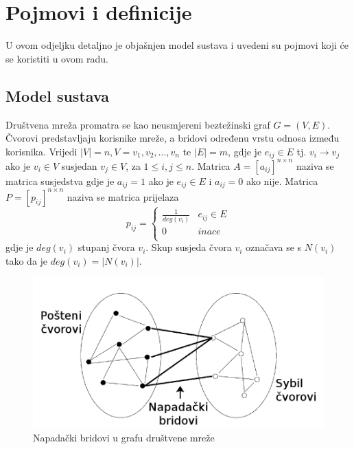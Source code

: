 \documentclass[times, utf8, seminar, numeric]{fer}
\begin{document}
\section{Pojmovi i definicije} \label{sec:terminology}
U ovom odjeljku detaljno je objašnjen model sustava i uvedeni su pojmovi koji će se koristiti u ovom radu.

\subsection{Model sustava}
Društvena mreža promatra se kao neusmjereni beztežinski graf $G = (V, E)$. Čvorovi predstavljaju korisnike mreže, a bridovi određenu vrstu odnosa između korisnika. Vrijedi $|V| = n, V = {v_1, v_2, ..., v_n}$ te $|E| = m$, gdje je $e_{ij} \in E$ tj. $v_i \to v_j$ ako je $v_i \in V$ susjedan $v_j \in V$, za $1 \leq i, j \leq n$. Matrica $A = [a_{ij}]^{n \times n}$ naziva se matrica susjedstva gdje je $a_{ij} = 1$ ako je $e_{ij} \in E$ i $a_{ij} = 0$ ako nije. Matrica $P = [p_{ij}]^{n \times n}$ naziva se matrica prijelaza 
\begin{equation} \label{eq:transition}
  p_{ij} = 
  \begin{cases}
    \frac{1}{deg(v_i)} & e_{ij} \in E \\
    0 & inace \\
  \end{cases}
\end{equation}
gdje je $deg(v_i)$ stupanj čvora $v_i$. Skup susjeda čvora $v_i$ označava se s $N(v_i)$ tako da je $deg(v_i) = |N(v_i)|$.

\begin{figure}[h]
	\centering
	\includegraphics[scale=0.3]{attack.png}
	\caption{Napadački bridovi u grafu društvene mreže}
	\label{fig:attack}
\end{figure}
\end{document}
